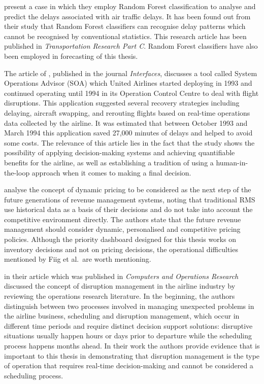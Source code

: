 \citet{RebolloBalakrishnan2014} present a case in which they employ Random Forest classification to analyse and predict the delays associated with air traffic delays. It has been found out from their study that Random Forest classifiers can recognise delay patterns which cannot be recognised by conventional statistics. This research article has been published in \textit{Transportation Research Part C}. Random Forest classifiers have also been employed in forecasting of this thesis.

The article of \citet{RakshitKrishnamurthyYu1996}, published in the journal \textit{Interfaces}, discusses a tool called System Operations Advisor (SOA) which United Airlines started deploying in 1993 and continued operating until 1994 in its Operation Control Centre to deal with flight disruptions. This application suggested several recovery strategies including delaying, aircraft swapping, and rerouting flights based on real-time operations data collected by the airline. It was estimated that between October 1993 and March 1994 this application saved 27,000 minutes of delays and helped to avoid some costs. The relevance of this article lies in the fact that the study shows the possibility of applying decision-making systems and achieving quantifiable benefits for the airline, as well as establishing a tradition of using a human-in-the-loop approach when it comes to making a final decision.

\citet{Fiig2016} analyse the concept of dynamic pricing to be considered as the next step of the future generations of revenue management systems, noting that traditional RMS use historical data as a basis of their decisions and do not take into account the competitive environment directly. The authors state that the future revenue management should consider dynamic, personalised and competitive pricing policies. Although the priority dashboard designed for this thesis works on inventory decisions and not on pricing decisions, the operational difficulties mentioned by Fiig et al.\ are worth mentioning.

\citet{ClausenLarsenLarsenRezanova2010} in their article which was published in \textit{Computers and Operations Research} discussed the concept of disruption management in the airline industry by reviewing the operations research literature. In the beginning, the authors distinguish between two processes involved in managing unexpected problems in the airline business, scheduling and disruption management, which occur in different time periods and require distinct decision support solutions: disruptive situations usually happen hours or days prior to departure while the scheduling process happens months ahead. In their work the authors provide evidence that is important to this thesis in demonstrating that disruption management is the type of operation that requires real-time decision-making and cannot be considered a scheduling process.

